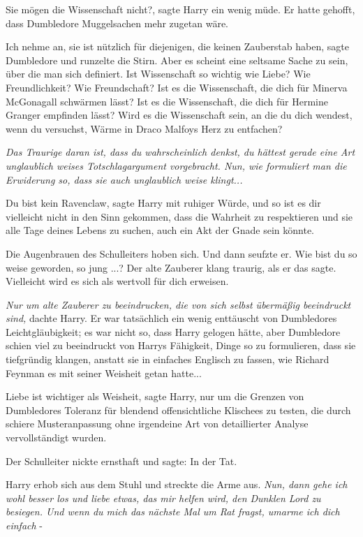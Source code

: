 \glqq Sie mögen die Wissenschaft nicht?\grqq{}, sagte Harry ein wenig müde. Er
hatte gehofft, dass Dumbledore Muggelsachen mehr zugetan wäre.

\glqq Ich nehme an, sie ist nützlich für diejenigen, die keinen Zauberstab
haben\grqq{}, sagte Dumbledore und runzelte die Stirn. \glqq Aber es scheint
eine seltsame Sache zu sein, über die man sich definiert. Ist Wissenschaft so
wichtig wie Liebe? Wie Freundlichkeit? Wie Freundschaft? Ist es die
Wissenschaft, die dich für Minerva McGonagall schwärmen lässt? Ist es die
Wissenschaft, die dich für Hermine Granger empfinden lässt? Wird es die
Wissenschaft sein, an die du dich wendest, wenn du versuchst, Wärme in Draco
Malfoys Herz zu entfachen?\grqq{}

\emph{Das Traurige daran ist, dass du wahrscheinlich denkst, du hättest gerade eine Art unglaublich weises Totschlagargument vorgebracht. Nun, wie formuliert man die Erwiderung so, dass sie auch unglaublich weise klingt...}

\glqq Du bist kein Ravenclaw\grqq{}, sagte Harry mit ruhiger Würde, \glqq und so
ist es dir vielleicht nicht in den Sinn gekommen, dass die Wahrheit zu
respektieren und sie alle Tage deines Lebens zu suchen, auch ein Akt der Gnade
sein könnte.\grqq{}

Die Augenbrauen des Schulleiters hoben sich. Und dann seufzte er. \glqq Wie bist
du so weise geworden, so jung ...?\grqq{} Der alte Zauberer klang traurig, als
er das sagte. \glqq Vielleicht wird es sich als wertvoll für dich
erweisen.\grqq{}

\emph{Nur um alte Zauberer zu beeindrucken, die von sich selbst übermäßig
beeindruckt sind, }dachte Harry. Er war tatsächlich ein wenig enttäuscht von
Dumbledores Leichtgläubigkeit; es war nicht so, dass Harry gelogen hätte, aber
Dumbledore schien viel zu beeindruckt von Harrys Fähigkeit, Dinge so zu
formulieren, dass sie tiefgründig klangen, anstatt sie in einfaches Englisch zu
fassen, wie Richard Feynman es mit seiner Weisheit getan hatte...

\glqq Liebe ist wichtiger als Weisheit\grqq{}, sagte Harry, nur um die Grenzen
von Dumbledores Toleranz für blendend offensichtliche Klischees zu testen, die
durch schiere Musteranpassung ohne irgendeine Art von detaillierter Analyse
vervollständigt wurden.

Der Schulleiter nickte ernsthaft und sagte: \glqq In der Tat.\grqq{}

Harry erhob sich aus dem Stuhl und streckte die Arme aus. \emph{Nun, dann gehe
ich wohl besser los und liebe etwas, das mir helfen wird, den Dunklen Lord zu
besiegen. Und wenn du mich das nächste Mal um Rat fragst, umarme ich dich
einfach }-


